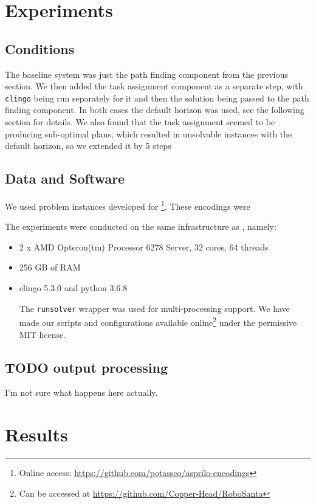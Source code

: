 \section{Experiments}
\label{sec:org15741d6}

\subsection{Conditions}
\label{sec:org6890f79}
The baseline system was just the path finding component from the previous section.
We then added the task assignment component as a separate step, with \texttt{clingo} being run separately for it and then the solution being passed to the path finding component.
In both cases the default horizon was used, see the following section for details.
We also found that the task assignment seemed to be producing sub-optimal plans, which resulted in unsolvable instances with the default horizon, so we extended it by 5 steps

\subsection{Data and Software}
\label{sec:orgf6d6b0b}
We used problem instances developed for \cite{gebser2018experimenting}\footnote{Online access: \url{https://github.com/potassco/asprilo-encodings}}.
These encodings were

The experiments were conducted on the same infrastructure as \cite{gebser2018experimenting}, namely:

\begin{itemize}
\item 2 x AMD Opteron(tm) Processor 6278 Server, 32 cores, 64 threads
\item 256 GB of RAM
\item clingo 5.3.0 and python 3.6.8

The \texttt{runsolver} wrapper was used for multi-processing support.
We have made our scripts and configurations available online\footnote{Can be accessed at \url{https://github.com/Copper-Head/RoboSanta}} under the permissive MIT license.
\end{itemize}
\subsection{{\bfseries\sffamily TODO} output processing}
\label{sec:org8c22942}
I'm not sure what happens here actually.

\section{Results}
\label{sec:orga828b77}
